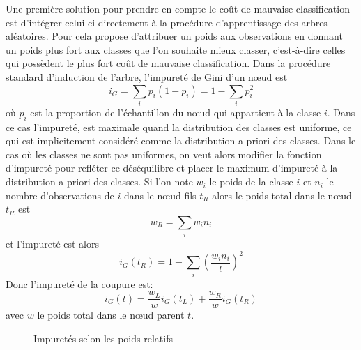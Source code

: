 Une première solution pour prendre en compte le coût de mauvaise classification est d'intégrer celui-ci directement à la procédure d'apprentissage des arbres aléatoires. Pour cela \citet{Breiman2001} propose d'attribuer un poids aux observations en donnant un poids plus fort aux classes que l'on souhaite mieux classer, c'est-à-dire celles qui possèdent le plus fort coût de mauvaise classification.
Dans la procédure standard d'induction de l'arbre, l'impureté de Gini d'un nœud est
\begin{equation*}
    i_G = \sum_i p_i ( 1 - p_i ) = 1 - \sum_i p_i^2
\end{equation*}
où $p_i$ est la proportion de l'échantillon du nœud qui appartient à la classe $i$. Dans ce cas l'impureté, est maximale quand la distribution des classes est uniforme, ce qui est implicitement considéré comme la distribution a priori des classes. Dans le cas où les classes ne sont pas uniformes, on veut alors modifier la fonction d'impureté pour refléter ce déséquilibre et placer le maximum d'impureté à la distribution a priori des classes. Si l'on note $w_i$ le poids de la classe $i$ et $n_i$ le nombre d'observations de $i$ dans le nœud fils $t_R$ alors le poids total dans le nœud $t_R$ est
\begin{equation*}
    w_R = \sum_i w_i n_i
\end{equation*}
et l'impureté est alors
\begin{equation*}
    i_G (t_R) = 1 - \sum_i \left( \frac{w_i n_i}{t} \right)^2
\end{equation*}
Donc l'impureté de la coupure est:
\begin{equation*}
    i_G (t) = \frac{w_L}{w} i_G(t_L) + \frac{w_R}{w} i_G(t_R)
\end{equation*}
avec $w$ le poids total dans le nœud parent $t$.


\begin{figure}[htbp]
    \caption{Impuretés selon les poids relatifs}
\end{figure}

